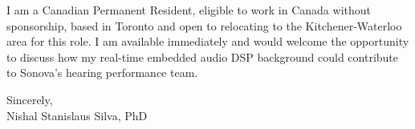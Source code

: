 \documentclass[11pt]{article}
\begin{document}
\vspace{0.5em}
\noindent I am a Canadian Permanent Resident, eligible to work in Canada without sponsorship, based in Toronto and open to relocating to the Kitchener-Waterloo area for this role. I am available immediately and would welcome the opportunity to discuss how my real-time embedded audio DSP background could contribute to Sonova's hearing performance team.

\vspace{1em}
\noindent Sincerely, \\
Nishal Stanislaus Silva, PhD
\end{document}
